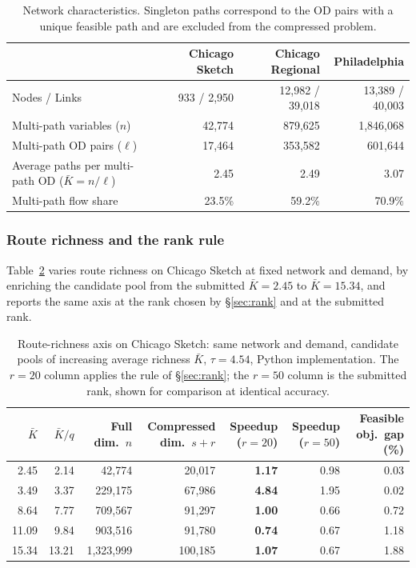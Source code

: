 \documentclass[11pt]{article}
\begin{document}
\begin{table}[h]
\centering
\caption{Network characteristics. Singleton paths correspond to the OD pairs with a unique feasible path and are excluded from the compressed problem.}
\label{tab:network-characteristics}
{\small
\begin{tabular}{lrrr}
\toprule
 & Chicago Sketch & Chicago Regional & Philadelphia \\
\midrule
Nodes / Links & 933 / 2{,}950 & 12{,}982 / 39{,}018 & 13{,}389 / 40{,}003 \\
Multi-path variables ($n$) & 42{,}774 & 879{,}625 & 1{,}846{,}068 \\
Multi-path OD pairs ($\ell$) & 17{,}464 & 353{,}582 & 601{,}644 \\
Average paths per multi-path OD ($\bar K=n/\ell$) & 2.45 & 2.49 & 3.07 \\
Multi-path flow share & 23.5\% & 59.2\% & 70.9\% \\
\bottomrule
\end{tabular}
}
\end{table}

\subsubsection*{Route richness and the rank rule}


Table~\ref{tab:cutoff-summary} varies route richness on Chicago Sketch at fixed network and
demand, by enriching the candidate pool from the submitted $\bar K=2.45$ to $\bar K=15.34$,
and reports the same axis at the rank chosen by \S\ref{sec:rank} and at the submitted rank.

\begin{table}[h]
\centering
\caption{Route-richness axis on Chicago Sketch: same network and demand,
candidate pools of increasing average richness $\bar K$, $\tau=4.54$, Python implementation.
The $r=20$ column applies the rule of \S\ref{sec:rank}; the $r=50$ column is the submitted
rank, shown for comparison at identical accuracy.}
\label{tab:cutoff-summary}
{\small
\begin{tabular}{rrrrrrr}
\toprule
$\bar K$ & $\bar K/q$ & Full dim.\ $n$ & Compressed dim.\ $s+r$ & \textbf{Speedup} ($r=20$) & Speedup ($r=50$) & Feasible obj.\ gap (\%)\\
\midrule
2.45  & 2.14  & 42{,}774      & 20{,}017  & \textbf{1.17} & 0.98 & 0.03\\
3.49  & 3.37  & 229{,}175     & 67{,}986  & \textbf{4.84} & 1.95 & 0.02\\
8.64  & 7.77  & 709{,}567     & 91{,}297  & \textbf{1.00} & 0.66 & 0.72\\
11.09 & 9.84  & 903{,}516     & 91{,}780  & \textbf{0.74} & 0.67 & 1.18\\
15.34 & 13.21 & 1{,}323{,}999 & 100{,}185 & \textbf{1.07} & 0.67 & 1.88\\
\bottomrule
\end{tabular}}
\end{table}
\end{document}
